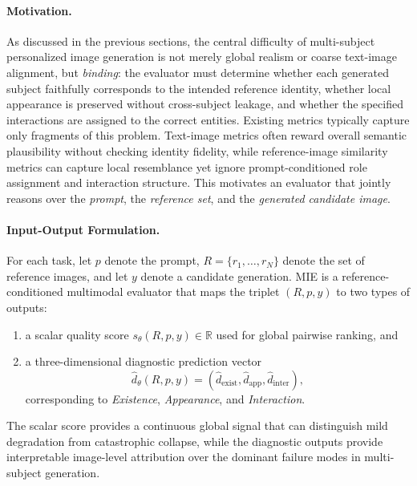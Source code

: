 \documentclass{article}
\begin{document}
\paragraph{Motivation.}
As discussed in the previous sections, the central difficulty of multi-subject personalized image generation is not merely global realism or coarse text-image alignment, but \emph{binding}: the evaluator must determine whether each generated subject faithfully corresponds to the intended reference identity, whether local appearance is preserved without cross-subject leakage, and whether the specified interactions are assigned to the correct entities. Existing metrics typically capture only fragments of this problem. Text-image metrics often reward overall semantic plausibility without checking identity fidelity, while reference-image similarity metrics can capture local resemblance yet ignore prompt-conditioned role assignment and interaction structure. This motivates an evaluator that jointly reasons over the \emph{prompt}, the \emph{reference set}, and the \emph{generated candidate image}.

\paragraph{Input-Output Formulation.}
For each task, let $p$ denote the prompt, $R=\{r_1,\dots,r_N\}$ denote the set of reference images, and let $y$ denote a candidate generation. MIE is a reference-conditioned multimodal evaluator that maps the triplet $(R,p,y)$ to two types of outputs:
\begin{enumerate}
    \item a scalar quality score $s_\theta(R,p,y)\in\mathbb{R}$ used for global pairwise ranking, and
    \item a three-dimensional diagnostic prediction vector
    \[
    \hat d_\theta(R,p,y) = (\hat d_{\text{exist}}, \hat d_{\text{app}}, \hat d_{\text{inter}}),
    \]
    corresponding to \emph{Existence}, \emph{Appearance}, and \emph{Interaction}.
\end{enumerate}

The scalar score provides a continuous global signal that can distinguish mild degradation from catastrophic collapse, while the diagnostic outputs provide interpretable image-level attribution over the dominant failure modes in multi-subject generation.
\end{document}

